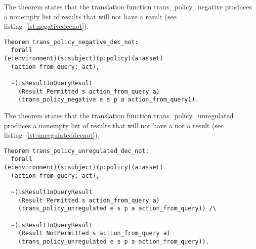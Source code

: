 The theorem  states that the translation function trans_policy_negative produces a nonempty list of results that will not have a  result (see listing~\ref{lst:negativedecnot}).

\begin{lstlisting}
Theorem trans_policy_negative_dec_not:
  forall 
(e:environment)(s:subject)(p:policy)(a:asset)
  (action_from_query: act),
 
  ~(isResultInQueryResult 
    (Result Permitted s action_from_query a)
    (trans_policy_negative e s p a action_from_query)).

\end{lstlisting}

The theorem  states that the translation function trans_policy_unregulated produces a nonempty list of results that will not have a  nor a  result (see listing~\ref{lst:unregulateddecnot}).


\begin{lstlisting}
Theorem trans_policy_unregulated_dec_not:
  forall 
(e:environment)(s:subject)(p:policy)(a:asset)
  (action_from_query: act),
 
  ~(isResultInQueryResult 
    (Result Permitted s action_from_query a)
    (trans_policy_unregulated e s p a action_from_query)) /\
  
  ~(isResultInQueryResult 
    (Result NotPermitted s action_from_query a)
    (trans_policy_unregulated e s p a action_from_query)).
\end{lstlisting}















